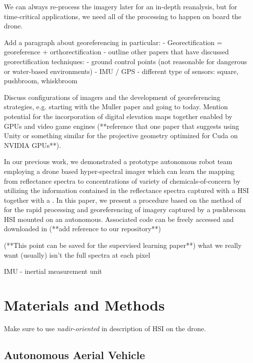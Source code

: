\documentclass[remotesensing,article,submit,pdftex,moreauthors]{Definitions/mdpi}
\begin{document}
We can always re-process the imagery later for an in-depth reanalysis, but for time-critical applications, we need all of the processing to happen on board the drone. 


Add a paragraph about georeferencing in particular:
- Georectification = georeference + orthorectification
- outline other papers that have discussed georectification techniques:
    - ground control points  (not reasonable for dangerous or water-based environments)
    - IMU / GPS
    - different type of sensors: square, pushbroom, whiskbroom

Discuss configurations of imagers and the development of georeferencing strategies, e.g. starting with the Muller paper and going to today. Mention potential for the incorporation of digital elevation maps together enabled by GPUs and video game engines (**reference that one paper that suggests using Unity or something similar for the projective geometry optimized for Cuda on NVIDIA GPUs**).

In our previous work, we demonstrated a prototype autonomous robot team employing a drone based hyper-spectral imager which can learn the mapping from reflectance spectra to concentrations of variety of chemicals-of-concern by utilizing the information contained in the reflectance spectra captured with a HSI together with a  \cite{robot-team-1}. In this paper, we present a procedure based on the method of \cite{muller-georeferencing} for the rapid processing and georeferencing of imagery captured by a pushbroom HSI mounted on an autonomous. Associated code can be freely accessed and downloaded in (**add reference to our repository**)

(**This point can be saved for the supervised learning paper**) what we really want (usually) isn't the full spectra at each pixel 

IMU - inertial measurement unit



\section{Materials and Methods}

Make sure to use \textit{nadir-oriented} in description of HSI on the drone. 

\subsection{Autonomous Aerial Vehicle}
\end{document}
